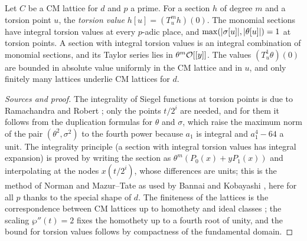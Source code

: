 \begin{theorem}\label{thm:B-torsion-values}
Let $C$ be a CM lattice for $d$ and $p$ a prime. For a section $h$ of degree $m$ and a torsion point
$u$, the \emph{torsion value} $h[u]=(T^m_uh)(0)$. The monomial sections have integral torsion values
at every $p$-adic place, and $\max(\lvert \sigma[u]\rvert,\lvert \theta[u]\rvert)=1$ at torsion points. A section with
integral torsion values is an integral combination of monomial sections, and its Taylor series lies
in $\theta^m\mathcal{O}[[y]]$. The values $(T^1_u\theta)(0)$ are bounded in absolute value uniformly in the CM
lattice and in $u$, and only finitely many lattices underlie CM lattices for $d$.
\end{theorem}

\begin{proof}[Sources and proof]
The integrality of Siegel functions at torsion points is due to Ramachandra and Robert
\cite{KubertLang1981}; only the points $t/2^i$ are needed, and for them it follows from the duplication
formulas for $\theta$ and $\sigma$, which raise the maximum norm of the pair $(\theta^2,\sigma^2)$ to the fourth
power because $a_1$ is integral and $a_1^4-64$ a unit. The integrality principle (a section with
integral torsion values has integral expansion) is proved by writing the section as
$\theta^m(P_0(x)+yP_1(x))$ and interpolating at the nodes $x(t/2^i)$, whose differences are units; this is
the method of Norman and Mazur--Tate as used by Bannai and Kobayashi \cite{BannaiKobayashi2010}, here for
all $p$ thanks to the special shape of $d$. The finiteness of the lattices is the correspondence
between CM lattices up to homothety and ideal classes \cite[II]{Silverman1994}; the scaling
$\wp''(t)=2$ fixes the homothety up to a fourth root of unity, and the bound for torsion values follows
by compactness of the fundamental domain.
\end{proof}

